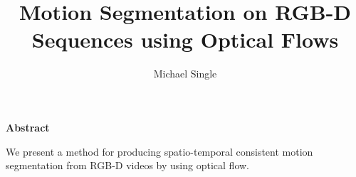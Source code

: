 \documentclass[a4paper]{report}
\begin{document}
\title{Motion Segmentation on RGB-D Sequences using Optical Flows}
\author{Michael Single}

 \setcounter{page}{1}
\maketitle

\newpage
\thispagestyle{empty}
\vspace{8cm}
\noindent
{\centerline {\bf \large Abstract}}
\vspace{1cm}


\noindent

We present a method for producing spatio-temporal consistent motion segmentation from RGB-D videos by using optical flow. 


 \setcounter{page}{1}
\tableofcontents

\newpage{\pagestyle{empty} \cleardoublepage}

 \setcounter{page}{1}
\pagestyle{fancy}


\newpage{\pagestyle{empty} \cleardoublepage}


\newpage{\pagestyle{empty} \cleardoublepage}


\newpage{\pagestyle{empty} \cleardoublepage}


\newpage{\pagestyle{empty} \cleardoublepage}


\newpage{\pagestyle{empty} \cleardoublepage}

\begin{appendix}

\newpage{\pagestyle{empty} \cleardoublepage}
\end{appendix}

\listoftables

\listoffigures

\listofalgorithms


\nocite{*}



\end{document}
